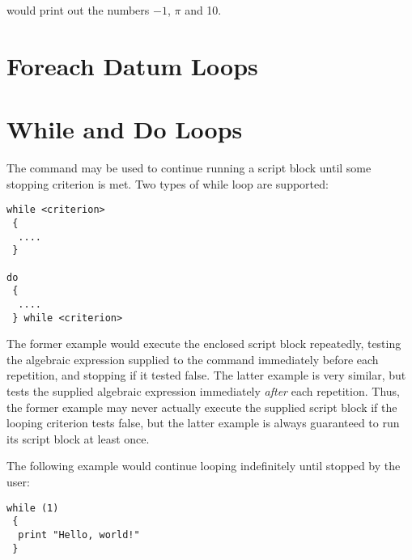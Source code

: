 \noindent would print out the numbers $-1$, $\pi$ and 10.

\section{Foreach Datum Loops}

\section{While and Do Loops}

The  command may be used to continue running a script block
until some stopping criterion is met. Two types of while loop are supported:

\begin{verbatim}
while <criterion>
 {
  ....
 }

do
 {
  ....
 } while <criterion>
\end{verbatim}

The former example would execute the enclosed script block repeatedly, testing
the algebraic expression supplied to the  command immediately
before each repetition, and stopping if it tested false. The latter example is
very similar, but tests the supplied algebraic expression immediately {\it
after} each repetition. Thus, the former example may never actually execute the
supplied script block if the looping criterion tests false, but the latter
example is always guaranteed to run its script block at least once.

The following example would continue looping indefinitely until stopped by the
user:

\begin{verbatim}
while (1)
 {
  print "Hello, world!"
 }
\end{verbatim}

